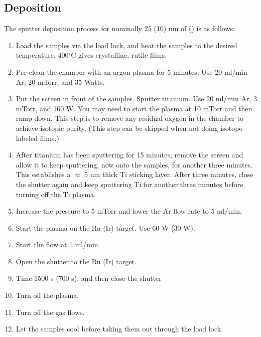 \subsection{Deposition}
The sputter deposition  process for nominally 25 (10) nm of  () is as follows:
\begin{enumerate}
	\item Load the samples via the load lock, and heat the samples to the desired temperature. 400$^\circ$C gives crystalline, rutile films.
	
	\item Pre-clean the chamber with an argon plasma for 5 minutes. Use 20 ml/min Ar, 20 mTorr, and 35 Watts.
	
	\item Put the screen in front of the samples. Sputter titanium. Use 20 ml/min Ar, 3 mTorr, and 160 W. You may need to start the plasma at 10 mTorr and then ramp down. This step is to remove any residual oxygen in the chamber to achieve isotopic purity. (This step can be skipped when not doing isotope-labeled films.)
	
	\item After titanium has been sputtering for 15 minutes, remove the screen and allow it to keep sputtering, now onto the samples, for another three minutes. This establishes a $\approx$ 5 nm thick Ti sticking layer. After three minutes, close the shutter again and keep sputtering Ti for another three minutes before turning off the Ti plasma.
	
	\item Increase the pressure to 5 mTorr and lower the Ar flow rate to 5 ml/min. 
	
	\item Start the plasma on the Ru (Ir) target. Use 60 W (30 W).
	
	\item Start the  flow at 1 ml/min.
	
	\item Open the shutter to the Ru (Ir) target. 
	
	\item Time 1500 s (700 s), and then close the shutter
	
	\item Turn off the plasma.
	
	\item Turn off the gas flows.
	
	\item Let the samples cool before taking them out through the load lock.
\end{enumerate}


